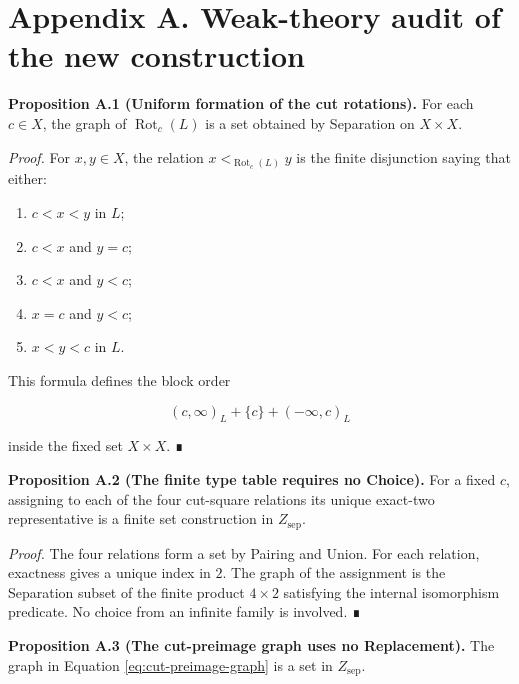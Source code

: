 \documentclass[
  english,
  11pt,
  reqno]{amsart}
\providecommand{\tightlist}{%
  \setlength{\itemsep}{0pt}\setlength{\parskip}{0pt}}
\begin{document}
\protect{}\label{app:weak-audit}

\section{Appendix A. Weak-theory audit of the new
construction}\label{appendix-a.-weak-theory-audit-of-the-new-construction}

\protect{}\label{prop:a-1-cut-relations}

\textbf{Proposition A.1 (Uniform formation of the cut rotations).} For
each \(c\in X\), the graph of \(\operatorname{Rot}_c(L)\) is a set
obtained by Separation on \(X\times X\).

\emph{Proof.} For \(x,y\in X\), the relation
\(x<_{\operatorname{Rot}_c(L)}y\) is the finite disjunction saying that
either:

\begin{enumerate}
\tightlist
\item
  \(c<x<y\) in \(L\);
\item
  \(c<x\) and \(y=c\);
\item
  \(c<x\) and \(y<c\);
\item
  \(x=c\) and \(y<c\);
\item
  \(x<y<c\) in \(L\).
\end{enumerate}

This formula defines the block order

\[
(c,\infty)_L+\{c\}+(-\infty,c)_L
\]

inside the fixed set \(X\times X\). ∎

\protect{}\label{prop:a-2-cut-table}

\textbf{Proposition A.2 (The finite type table requires no Choice).} For
a fixed \(c\), assigning to each of the four cut-square relations its
unique exact-two representative is a finite set construction in
\(Z_{\mathrm{sep}}\).

\emph{Proof.} The four relations form a set by Pairing and Union. For
each relation, exactness gives a unique index in \(2\). The graph of the
assignment is the Separation subset of the finite product \(4\times2\)
satisfying the internal isomorphism predicate. No choice from an
infinite family is involved. ∎

\protect{}\label{prop:a-3-delta-graph}

\textbf{Proposition A.3 (The cut-preimage graph uses no Replacement).}
The graph in Equation
\hyperref[eq:cut-preimage-graph]{\eqref{eq:cut-preimage-graph}} is a set
in \(Z_{\mathrm{sep}}\).
\end{document}

